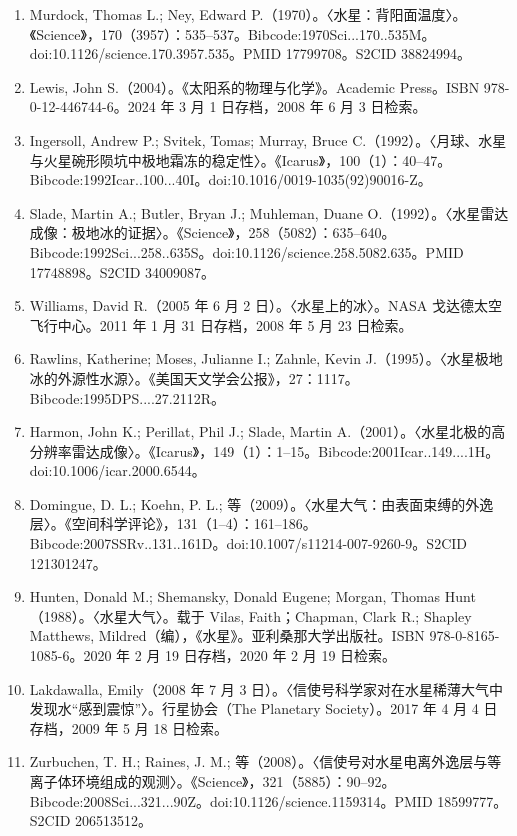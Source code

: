 \begin{enumerate}
    \item Murdock, Thomas L.; Ney, Edward P.（1970）。〈水星：背阳面温度〉。《Science》，170（3957）：535–537。Bibcode:1970Sci...170..535M。doi:10.1126/science.170.3957.535。PMID 17799708。S2CID 38824994。
    \item Lewis, John S.（2004）。《太阳系的物理与化学》。Academic Press。ISBN 978-0-12-446744-6。2024 年 3 月 1 日存档，2008 年 6 月 3 日检索。
    \item Ingersoll, Andrew P.; Svitek, Tomas; Murray, Bruce C.（1992）。〈月球、水星与火星碗形陨坑中极地霜冻的稳定性〉。《Icarus》，100（1）：40–47。Bibcode:1992Icar..100...40I。doi:10.1016/0019-1035(92)90016-Z。
    \item Slade, Martin A.; Butler, Bryan J.; Muhleman, Duane O.（1992）。〈水星雷达成像：极地冰的证据〉。《Science》，258（5082）：635–640。Bibcode:1992Sci...258..635S。doi:10.1126/science.258.5082.635。PMID 17748898。S2CID 34009087。
    \item Williams, David R.（2005 年 6 月 2 日）。〈水星上的冰〉。NASA 戈达德太空飞行中心。2011 年 1 月 31 日存档，2008 年 5 月 23 日检索。
    \item Rawlins, Katherine; Moses, Julianne I.; Zahnle, Kevin J.（1995）。〈水星极地冰的外源性水源〉。《美国天文学会公报》，27：1117。Bibcode:1995DPS....27.2112R。
    \item Harmon, John K.; Perillat, Phil J.; Slade, Martin A.（2001）。〈水星北极的高分辨率雷达成像〉。《Icarus》，149（1）：1–15。Bibcode:2001Icar..149....1H。doi:10.1006/icar.2000.6544。
    \item Domingue, D. L.; Koehn, P. L.; 等（2009）。〈水星大气：由表面束缚的外逸层〉。《空间科学评论》，131（1–4）：161–186。Bibcode:2007SSRv..131..161D。doi:10.1007/s11214-007-9260-9。S2CID 121301247。
    \item Hunten, Donald M.; Shemansky, Donald Eugene; Morgan, Thomas Hunt（1988）。〈水星大气〉。载于 Vilas, Faith；Chapman, Clark R.; Shapley Matthews, Mildred（编），《水星》。亚利桑那大学出版社。ISBN 978-0-8165-1085-6。2020 年 2 月 19 日存档，2020 年 2 月 19 日检索。
    \item Lakdawalla, Emily（2008 年 7 月 3 日）。〈信使号科学家对在水星稀薄大气中发现水“感到震惊”〉。行星协会（The Planetary Society）。2017 年 4 月 4 日存档，2009 年 5 月 18 日检索。
    \item Zurbuchen, T. H.; Raines, J. M.; 等（2008）。〈信使号对水星电离外逸层与等离子体环境组成的观测〉。《Science》，321（5885）：90–92。Bibcode:2008Sci...321...90Z。doi:10.1126/science.1159314。PMID 18599777。S2CID 206513512。

\end{enumerate}
